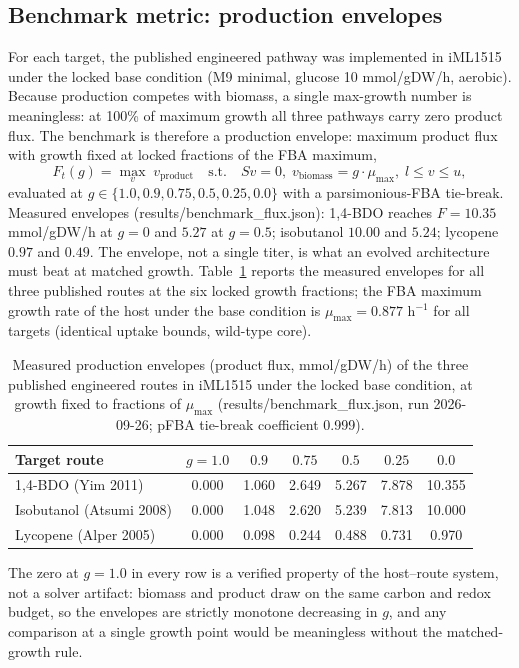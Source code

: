 \documentclass[12pt,a4paper]{article}
\begin{document}
\subsection{Benchmark metric: production envelopes}
For each target, the published engineered pathway was implemented in iML1515 under the locked base condition (M9 minimal, glucose 10 mmol/gDW/h, aerobic). Because production competes with biomass, a single max-growth number is meaningless: at 100\% of maximum growth all three pathways carry zero product flux. The benchmark is therefore a production envelope: maximum product flux with growth fixed at locked fractions of the FBA maximum,
\begin{equation}
F_t(g) = \max_{v} \; v_{\text{product}} \quad \text{s.t.} \quad S v = 0, \; v_{\text{biomass}} = g \cdot \mu_{\max}, \; l \le v \le u,
\end{equation}
evaluated at $g \in \{1.0, 0.9, 0.75, 0.5, 0.25, 0.0\}$ with a parsimonious-FBA tie-break. Measured envelopes (results/benchmark\_flux.json): 1,4-BDO reaches $F=10.35$ mmol/gDW/h at $g=0$ and $5.27$ at $g=0.5$; isobutanol $10.00$ and $5.24$; lycopene $0.97$ and $0.49$. The envelope, not a single titer, is what an evolved architecture must beat at matched growth.
Table~\ref{tab:envelopes} reports the measured envelopes for all three published routes at the six locked growth fractions; the FBA maximum growth rate of the host under the base condition is $\mu_{\max} = 0.877$ h$^{-1}$ for all targets (identical uptake bounds, wild-type core).
\begin{table}[h]
\centering
\caption{Measured production envelopes (product flux, mmol/gDW/h) of the three published engineered routes in iML1515 under the locked base condition, at growth fixed to fractions of $\mu_{\max}$ (results/benchmark\_flux.json, run 2026-09-26; pFBA tie-break coefficient 0.999).}
\label{tab:envelopes}
\begin{tabular}{lcccccc}
\hline
Target route & $g{=}1.0$ & $0.9$ & $0.75$ & $0.5$ & $0.25$ & $0.0$ \\
\hline
1,4-BDO (Yim 2011) & 0.000 & 1.060 & 2.649 & 5.267 & 7.878 & 10.355 \\
Isobutanol (Atsumi 2008) & 0.000 & 1.048 & 2.620 & 5.239 & 7.813 & 10.000 \\
Lycopene (Alper 2005) & 0.000 & 0.098 & 0.244 & 0.488 & 0.731 & 0.970 \\
\hline
\end{tabular}
\end{table}
The zero at $g=1.0$ in every row is a verified property of the host--route system, not a solver artifact: biomass and product draw on the same carbon and redox budget, so the envelopes are strictly monotone decreasing in $g$, and any comparison at a single growth point would be meaningless without the matched-growth rule.
\end{document}
